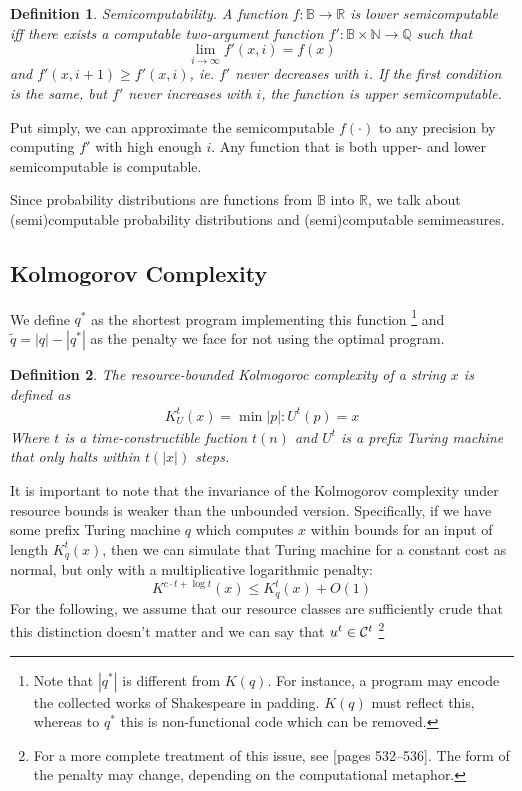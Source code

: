 \documentclass[10pt,a4paper,oneside]{article}
\newtheorem{dfn}{Definition}
\begin{document}
\begin{dfn}
Semicomputability. A function $f : {\mathbb B} \rightarrow {\mathbb R}$ is \emph{lower semicomputable} iff there exists a computable two-argument function $f': {\mathbb B} \times {\mathbb N} \rightarrow \mathbb Q$ such that  
\[
\lim_{i \rightarrow \infty} f'(x, i) = f(x)
\] and $f'(x, i + 1) \geq f'(x, i)$, ie. $f'$ never decreases with $i$. If the first condition is the same, but $f'$ never \emph{increases} with $i$, the function is \emph{upper semicomputable}.
\end{dfn}

Put simply, we can approximate the semicomputable $f(\cdot)$ to any precision by computing $f'$ with high enough $i$. Any function that is both upper- and lower semicomputable is computable.

Since probability distributions are functions from $\mathbb B$ into $\mathbb R$, we talk about (semi)computable probability distributions and (semi)computable semimeasures.

\subsection*{Kolmogorov Complexity}

We define $q^*$ as the shortest program implementing this function \footnote{Note that $|q^*|$ is different from $K(q)$. For instance, a program may encode the collected works of Shakespeare in padding. $K(q)$ must reflect this, whereas to $q^*$ this is non-functional code which can be removed.} and $\tilde{q} = |q| - |q^*|$ as the penalty we face for not using the optimal program.

\begin{dfn}
The \emph{resource-bounded Kolmogoroc complexity} of a string $x$ is defined as
\begin{align*}
K_U^t(x) = \min{|p| : U^t(p) = x}
\end{align*}
Where $t$ is a time-constructible fuction $t(n)$ and $U^t$ is a prefix Turing machine that only halts within $t(|x|)$ steps.
\end{dfn}

It is important to note that the invariance of the Kolmogorov complexity under resource bounds is weaker than the unbounded version. Specifically, if we have some prefix Turing machine $q$ which computes $x$ within bounds for an input of length $K^t_q(x)$, then we can simulate that Turing machine for a constant cost as normal, but only with a multiplicative logarithmic penalty:
\[
K^{c \cdot t + \log t}(x) \leq K^t_q(x) + O(1)
\] 
For the following, we assume that our resource classes are sufficiently crude that this distinction doesn't matter and we can say that $u^t \in {\cal C}^t$ \footnote{For a more complete treatment of this issue, see \cite{li1993introduction}[pages 532--536]. The form of the penalty may change, depending on the computational metaphor.} 
\end{document}

